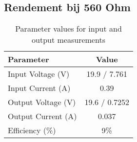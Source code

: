 \subsection{Rendement bij 560 Ohm}
\begin{table}[h!]
\centering
\begin{tabular}{|l|c|}
\hline
\textbf{Parameter} & \textbf{Value} \\ \hline
Input Voltage (V) & 19.9 / 7.761 \\ \hline
Input Current (A) & 0.39 \\ \hline
Output Voltage (V) & 19.6 / 0.7252 \\ \hline
Output Current (A) & 0.037 \\ \hline
Efficiency (\%) & 9\% \\ \hline
\end{tabular}
\caption{Parameter values for input and output measurements}
\label{tab:parameter_values}
\end{table}
